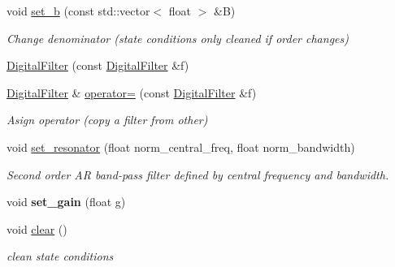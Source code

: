 \begin{DoxyCompactItemize}
void \hyperlink{classupc_1_1DigitalFilter_a9f23a5e9db027eb0c9b70bd9b5d08e09}{set\+\_\+b} (const std\+::vector$<$ float $>$ \&B)
\begin{DoxyCompactList}\small\item\em Change denominator (state conditions only cleaned if order changes) \end{DoxyCompactList}\item 
\hyperlink{classupc_1_1DigitalFilter_a54937beb73f0789cb9265498522da628}{Digital\+Filter} (const \hyperlink{classupc_1_1DigitalFilter}{Digital\+Filter} \&f)
\item 
\mbox{\label{classupc_1_1DigitalFilter_a26527559b1b71aad240deca22f5599ec}} 
\hyperlink{classupc_1_1DigitalFilter}{Digital\+Filter} \& \hyperlink{classupc_1_1DigitalFilter_a26527559b1b71aad240deca22f5599ec}{operator=} (const \hyperlink{classupc_1_1DigitalFilter}{Digital\+Filter} \&f)
\begin{DoxyCompactList}\small\item\em Asign operator (copy a filter from other) \end{DoxyCompactList}\item 
\mbox{\label{classupc_1_1DigitalFilter_a2b97aaeacac8b5a8b52e1bd8fc295970}} 
void \hyperlink{classupc_1_1DigitalFilter_a2b97aaeacac8b5a8b52e1bd8fc295970}{set\+\_\+resonator} (float norm\+\_\+central\+\_\+freq, float norm\+\_\+bandwidth)
\begin{DoxyCompactList}\small\item\em Second order AR band-\/pass filter defined by central frequency and bandwidth. \end{DoxyCompactList}\item 
\mbox{\label{classupc_1_1DigitalFilter_a506905346c44ac46c292ea1fa1212c3e}} 
void {\bfseries set\+\_\+gain} (float g)
\item 
\mbox{\label{classupc_1_1DigitalFilter_ad6c0f9584687642434081448f85d89f9}} 
void \hyperlink{classupc_1_1DigitalFilter_ad6c0f9584687642434081448f85d89f9}{clear} ()
\begin{DoxyCompactList}\small\item\em clean state conditions \end{DoxyCompactList}\item 
\mbox{\label{classupc_1_1DigitalFilter_a8d8f578b514a2dd58a545a68fdf441ee}} 

\end{DoxyCompactItemize}
